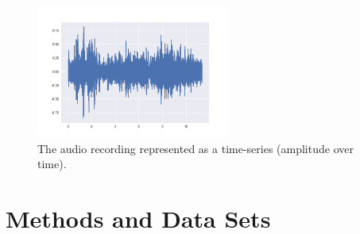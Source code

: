 \documentclass[10pt,twocolumn]{article}
\begin{document}
\begin{figure}[!h]
  \begin{center}
    \includegraphics[width=2.5in]{images/01.png}
  \end{center}

  \caption{The audio recording represented as a time-series (amplitude over time).}
  \label{time-series}
\end{figure}


\section{Methods and Data Sets}
\end{document}

